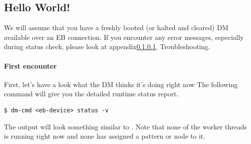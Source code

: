 \subsection{Hello World!}

We will assume that you have a freshly booted (or halted and cleared) DM available over an EB connection. If you encounter any error messages, especially during status check, please look at appendix\ref{}, Troubleshooting.

\paragraph{First encounter}

First, let's have a look what the DM thinks it's doing right now
The following command will give you the detailed runtime status report.
%
\begin{lstlisting}[style = customshell]
$ dm-cmd <eb-device> status -v
\end{lstlisting}
%
The output will look something similar to . Note that none of the worker threads is running right now and none has assigned a pattern or node to it.




